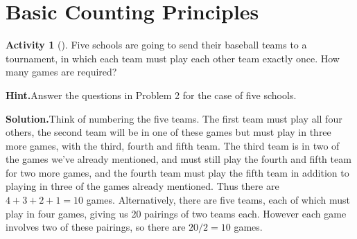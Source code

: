 \documentclass[10pt,]{book}
\theoremstyle{plain}
\theoremstyle{definition}
\newtheorem{activity}[project]{Activity}
\numberwithin{equation}{chapter}
\begin{document}
\section[{Basic Counting Principles}]{Basic Counting Principles}\label{section-2}
\typeout{************************************************}
\typeout{************************************************}
\begin{activity}[]\label{fiveteamtournament}
Five schools are going to send their baseball teams to a tournament, in which each team must play each other team exactly once. How many games are required?%
\par\medskip\noindent%
\textbf{Hint.}\quad Answer the questions in Problem 2 for the case of five schools.%
\par\medskip\noindent%
\textbf{Solution.}\quad Think of numbering the five teams. The first team must play all four others, the second team will be in one of these games but must play in three more games, with the third, fourth and fifth team. The third team is in two of the games we've already mentioned, and must still play the fourth and fifth team for two more games, and the fourth team must play the fifth team in addition to playing in three of the games already mentioned. Thus there are \(4+3+2+1 = 10\) games. Alternatively, there are five teams, each of which must play in four games, giving us 20 pairings of two teams each. However each game involves two of these pairings, so there are \(20/2 =10\) games.%
\end{activity}
\end{document}
